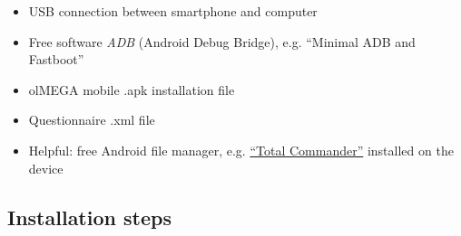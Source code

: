 \documentclass[11pt,a4paper,titlepage]{article}
\newcommand\ClrSquare[1]{\textcolor{#1}{\rule{7pt}{7pt}}}
\begin{document}
\begin{itemize}[label=\ClrSquare{jadeRed}]
	\item USB connection between smartphone and computer
	\item Free software \textit{ADB} (Android Debug Bridge), e.g. ``Minimal ADB and Fastboot''
	\item olMEGA mobile .apk installation file
	\item Questionnaire .xml file
	\item Helpful: free Android file manager, e.g. \href{https://total-commander.de.uptodown.com/android}{``Total Commander''} installed on the device
\end{itemize}


\subsection{Installation steps}\label{sub:installation}
\end{document}
